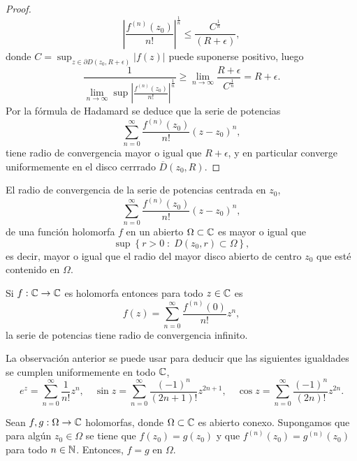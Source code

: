 \begin{proof}
\[ \left|\frac{f^{\left(n\right)}\left(z_{0}\right)}{n!}\right|^{\frac{1}{n}}\leq \frac{C^{\frac{1}{n}}}{\left(R+\epsilon \right)} ,\]
donde $\displaystyle C = \sup_{z \in \partial D\left(z_{0}, R + \epsilon \right)} \left|f\left(z\right)\right| $ puede suponerse positivo, luego
\[\frac{1}{\lim_{n \to \infty}\sup \left|\frac{f^{\left(n\right)}\left(z_{0}\right)}{n!}\right|^{\frac{1}{n}}}\geq \lim_{n \to \infty }\frac{R + \epsilon }{C^{\frac{1}{n}}} = R + \epsilon  .\]
Por la fórmula de Hadamard se deduce que la serie de potencias 
\[\sum^{\infty}_{n = 0}\frac{f^{\left(n\right)}\left(z_{0}\right)}{n!}\left(z-z_{0}\right)^{n} ,\]
tiene radio de convergencia mayor o igual que $\displaystyle R + \epsilon  $, y en particular converge uniformemente en el disco cerrrado $\displaystyle \overline{D}\left(z_{0}, R\right) $. 
\end{proof}
\begin{colorary}
El radio de convergencia de la serie de potencias centrada en $\displaystyle z_{0} $, 
\[\sum^{\infty}_{ n=0}\frac{f^{\left(n\right)}\left(z_{0}\right)}{n!}\left(z-z_{0}\right)^{n} ,\]
de una función holomorfa $\displaystyle f $ en un abierto $\displaystyle \Omega \subset \mathbb{C} $ es mayor o igual que 
\[\sup \left\{ r > 0 \; : \; D\left(z_{0}, r\right)\subset \Omega \right\} ,\]
es decir, mayor o igual que el radio del mayor disco abierto de centro $\displaystyle z_{0} $ que esté contenido en $\displaystyle \Omega  $.
\end{colorary}
\begin{observation}
Si $\displaystyle f : \mathbb{C} \to \mathbb{C} $ es holomorfa entonces para todo $\displaystyle z \in \mathbb{C} $ es
\[f\left(z\right)=\sum^{\infty}_{n=0}\frac{f^{\left(n\right)}\left(0\right)}{n!}z^{n} ,\]
la serie de potencias tiene radio de convergencia infinito. 
\end{observation}
\begin{eg}
La observación anterior se puede usar para deducir que las siguientes igualdades se cumplen uniformemente en todo $\displaystyle \mathbb{C} $, 
\[e^{z}=\sum^{\infty}_{n = 0}\frac{1}{n!}z^{n}, \quad \sin z = \sum^{\infty}_{n = 0}\frac{\left(-1\right)^{n}}{\left(2n+1\right)!}z^{2n+1}, \quad \cos z = \sum^{\infty }_{n = 0}\frac{\left(-1\right)^{n}}{\left(2n\right)!}z^{2n} .\]
\end{eg}
\begin{colorary}
Sean $\displaystyle f,g : \Omega \to \mathbb{C} $ holomorfas, donde $\displaystyle \Omega \subset \mathbb{C} $ es abierto conexo. Supongamos que para algún $\displaystyle z_{0} \in \Omega  $ se tiene que $\displaystyle f\left(z_{0}\right)=g\left(z_{0}\right) $ y que $\displaystyle f^{\left(n\right)}\left(z_{0}\right)=g^{\left(n\right)}\left(z_{0}\right) $ para todo $\displaystyle n\in \mathbb{N} $. Entonces, $\displaystyle f = g $ en $\displaystyle \Omega  $. 
\end{colorary}
